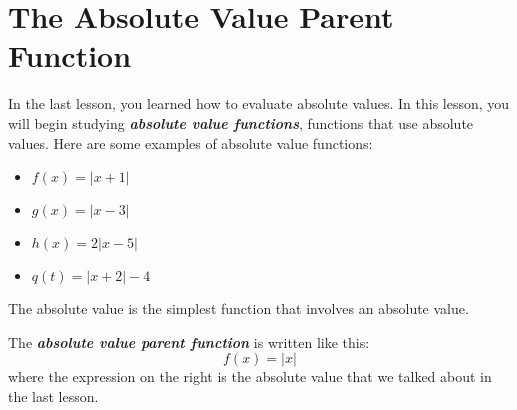 

\section*{The Absolute Value Parent Function}

In the last lesson, you learned how to evaluate absolute values.
In this lesson, you will begin studying 
{\bfseries\itshape absolute value functions},
functions that use absolute values.
Here are some examples of absolute value functions:
\begin{itemize}
    \item $f(x) = |x +1|$
    \item $g(x) = |x - 3|$
    \item $h(x) = 2|x-5|$
    \item $q(t) = |x+2| - 4$
\end{itemize}
%
The absolute value  
is the simplest function that involves an absolute value.

\begin{center}
    \begin{tcolorbox}
        The {\bfseries\itshape absolute value parent function} is written like this:
        \[
            f(x) = |x|
        \]
        where the expression on the right is the absolute value that we talked about 
        in the last lesson.
    \end{tcolorbox}
\end{center}



